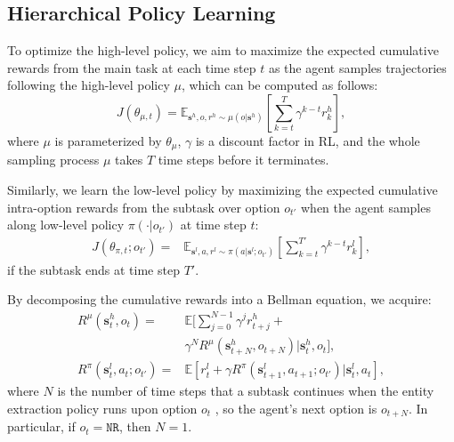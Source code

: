 \documentclass[letterpaper]{article}
\theoremstyle{definition}
\begin{document}
\subsection{Hierarchical Policy Learning}

To optimize the high-level policy, we aim to maximize the expected cumulative rewards from the main task at each time step $t$ as the agent samples trajectories following the high-level policy $\mu$, which can be computed as follows:
\begin{equation}\label{return_high}
    J(\theta_{\mu,t}) = \mathbb{E}_{\mathbf{s}^h,o,r^h \sim \mu(o|\mathbf{s}^h)} [\sum_{k=t}^T \gamma^{k-t} r_k^h], %
\end{equation}
where $\mu$ is parameterized by $\theta_\mu$, $\gamma$ is a discount factor in RL, and the whole sampling process $\mu$ takes $T$ time steps before it terminates.

Similarly, we learn the low-level policy by maximizing the expected cumulative intra-option rewards from the subtask over option $o_{t'}$ when the agent samples along low-level policy $\pi(\cdot|o_{t'})$ at time step $t$:
\begin{equation}\label{return_low}
    \begin{split}
        J(\theta_{\pi,t};o_{t'}) =& \mathbb{E}_{\mathbf{s}^l,a,r^l \sim \pi(a|\mathbf{s}^l;o_{t'})} [\sum_{k=t}^{T'} \gamma^{k-t} r_k^l ], %
    \end{split}
\end{equation}
if the subtask ends at time step $T'$.

By decomposing the cumulative rewards into a Bellman equation, we acquire:
\begin{equation}\label{return}
    \begin{split}
        R^\mu(\mathbf{s}_t^h, o_t) =& \mathbb{E} [\sum_{j=0}^{N-1} \gamma^j r_{t+j}^h + \\ &\gamma^{N} R^\mu(\mathbf{s}_{t+N}^h, o_{t+N}) |\mathbf{s}_t^h, o_t], \\
        R^\pi(\mathbf{s}_t^l, a_t; o_{t'}) =& \mathbb{E} [r_t^l + \gamma R^\pi(\mathbf{s}_{t+1}^l, a_{t+1}; o_{t'}) | \mathbf{s}_t^l, a_t],
    \end{split}
\end{equation}
where $N$ is the number of time steps that a subtask continues when the entity extraction policy runs upon option $o_t$
, so the agent's next option is $o_{t+N}$. In particular, if $o_t = \texttt{NR}$, then $N = 1$.
\end{document}
